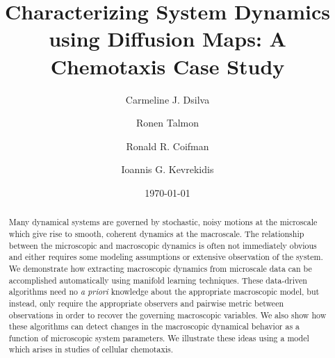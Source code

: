 \documentclass[prl, reprint, final, showkeys]{revtex4-1}
\begin{document}
\title{Characterizing System Dynamics using Diffusion Maps: A Chemotaxis Case Study}

\author{Carmeline J. Dsilva}

\author{Ronen Talmon}

\author{Ronald R. Coifman}

\author{Ioannis G. Kevrekidis}

\date{\today}

\begin{abstract}

Many dynamical systems are governed by stochastic, noisy motions at the microscale which give rise to smooth, coherent dynamics at the macroscale.
%
The relationship between the microscopic and macroscopic dynamics is often not immediately obvious and either requires some modeling assumptions or extensive observation of the system.
%
We demonstrate how extracting macroscopic dynamics from microscale data can be accomplished automatically using manifold learning techniques. 
%
These data-driven algorithms need no {\em a priori} knowledge about the appropriate macroscopic model, but instead, only require the appropriate observers and pairwise metric between observations in order to recover the governing macroscopic variables.
%
We also show how these algorithms can detect changes in the macroscopic dynamical behavior as a function of microscopic system parameters. 
%
We illustrate these ideas using a model which arises in studies of cellular chemotaxis.

\end{abstract}


\maketitle

 
\end{document}
